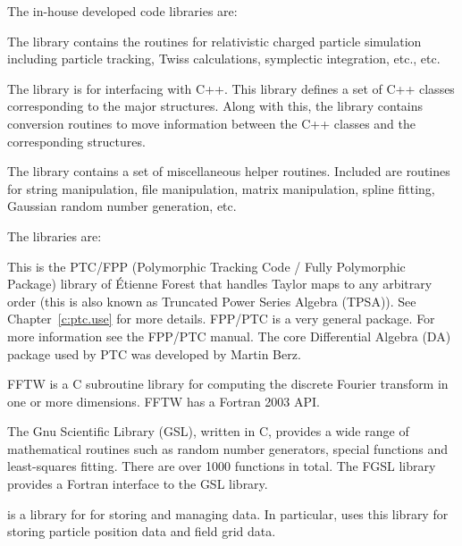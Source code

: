 {{{{{{The in-house developed code libraries are:
\begin{description}
  \item[bmad] \Newline
The  library contains the routines for relativistic charged particle simulation including
particle tracking, Twiss calculations, symplectic integration, etc., etc.
  \item[cpp_bmad_interface]
The  library is for interfacing \bmad with C++.  This library defines a set
of C++ classes corresponding to the major \bmad structures. Along with this, the library contains
conversion routines to move information between the C++ classes and the corresponding \bmad
structures.
  \item[sim_utils] \Newline
The  library contains a set of miscellaneous helper routines.  Included are routines
for string manipulation, file manipulation, matrix manipulation, spline fitting, Gaussian random
number generation, etc.
\end{description}
%  
The  libraries are:
\begin{description}
  \item[forest] \Newline
This is the PTC/FPP (Polymorphic Tracking Code / Fully Polymorphic Package) library of \'Etienne
Forest that handles Taylor maps to any arbitrary order (this is also known as Truncated Power Series
Algebra (TPSA)). See Chapter~\ref{c:ptc.use} for more details.  FPP/PTC is a very general
package. For more information see the FPP/PTC manual\cite{b:ptc}. The core Differential Algebra (DA)
package used by PTC was developed by Martin Berz\cite{b:berz}.
%
  \item[fftw] \Newline
FFTW is a C subroutine library for computing the discrete Fourier transform in one or more
dimensions. FFTW has a Fortran 2003 API.
%
  \item[gsl / fgsl] \Newline
The Gnu Scientific Library (GSL), written in C, provides a wide range of mathematical routines such
as random number generators, special functions and least-squares fitting. There are over 1000
functions in total. The FGSL library provides a Fortran interface to the GSL library.
%
  \item[hdf5] \Newline
{} is a library for for storing and managing data\cite{b:hdf5}. In particular, \bmad uses
this library for storing particle position data and field grid data.
%

\end{description}}}}}}}
